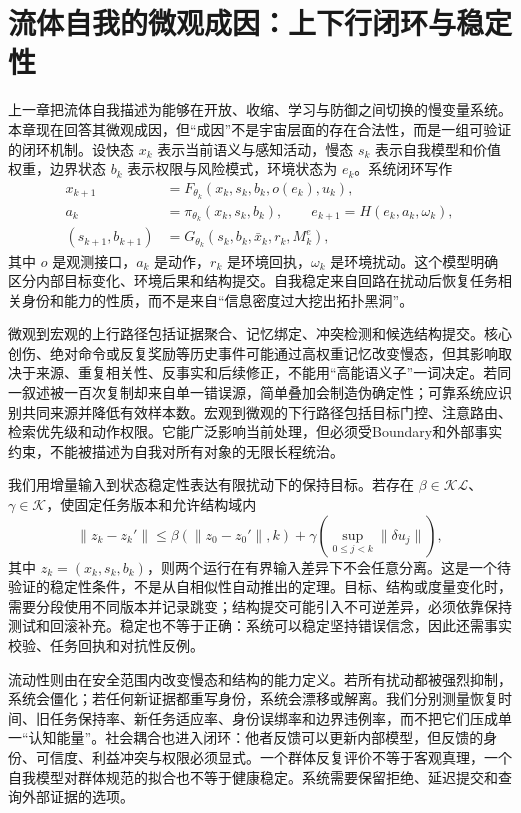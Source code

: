 \section{流体自我的微观成因：上下行闭环与稳定性}
\label{sec:section_5428}
上一章把流体自我描述为能够在开放、收缩、学习与防御之间切换的慢变量系统。本章现在回答其微观成因，但“成因”不是宇宙层面的存在合法性，而是一组可验证的闭环机制。设快态 $x_k$ 表示当前语义与感知活动，慢态 $s_k$ 表示自我模型和价值权重，边界状态 $b_k$ 表示权限与风险模式，环境状态为 $e_k$。系统闭环写作
\[
\begin{aligned}
x_{k+1}&=F_{\theta_k}(x_k,s_k,b_k,o(e_k),u_k),\\
a_k&=\pi_{\theta_k}(x_k,s_k,b_k),\qquad e_{k+1}=H(e_k,a_k,\omega_k),\\
(s_{k+1},b_{k+1})&=G_{\theta_k}(s_k,b_k,\bar x_k,r_k,M^e_k),
\end{aligned}
\]
其中 $o$ 是观测接口，$a_k$ 是动作，$r_k$ 是环境回执，$\omega_k$ 是环境扰动。这个模型明确区分内部目标变化、环境后果和结构提交。自我稳定来自回路在扰动后恢复任务相关身份和能力的性质，而不是来自“信息密度过大挖出拓扑黑洞”。

微观到宏观的上行路径包括证据聚合、记忆绑定、冲突检测和候选结构提交。核心创伤、绝对命令或反复奖励等历史事件可能通过高权重记忆改变慢态，但其影响取决于来源、重复相关性、反事实和后续修正，不能用“高能语义子”一词决定。若同一叙述被一百次复制却来自单一错误源，简单叠加会制造伪确定性；可靠系统应识别共同来源并降低有效样本数。宏观到微观的下行路径包括目标门控、注意路由、检索优先级和动作权限。它能广泛影响当前处理，但必须受Boundary和外部事实约束，不能被描述为自我对所有对象的无限长程统治。

我们用增量输入到状态稳定性表达有限扰动下的保持目标。若存在 $\beta\in\mathcal{KL}$、$\gamma\in\mathcal K$，使固定任务版本和允许结构域内
\[
\|z_k-z_k'\|\leq \beta(\|z_0-z_0'\|,k)+
\gamma\!\left(\sup_{0\leq j<k}\|\delta u_j\|\right),
\]
其中 $z_k=(x_k,s_k,b_k)$，则两个运行在有界输入差异下不会任意分离。这是一个待验证的稳定性条件，不是从自相似性自动推出的定理。目标、结构或度量变化时，需要分段使用不同版本并记录跳变；结构提交可能引入不可逆差异，必须依靠保持测试和回滚补充。稳定也不等于正确：系统可以稳定坚持错误信念，因此还需事实校验、任务回执和对抗性反例。

流动性则由在安全范围内改变慢态和结构的能力定义。若所有扰动都被强烈抑制，系统会僵化；若任何新证据都重写身份，系统会漂移或解离。我们分别测量恢复时间、旧任务保持率、新任务适应率、身份误绑率和边界违例率，而不把它们压成单一“认知能量”。社会耦合也进入闭环：他者反馈可以更新内部模型，但反馈的身份、可信度、利益冲突与权限必须显式。一个群体反复评价不等于客观真理，一个自我模型对群体规范的拟合也不等于健康稳定。系统需要保留拒绝、延迟提交和查询外部证据的选项。

